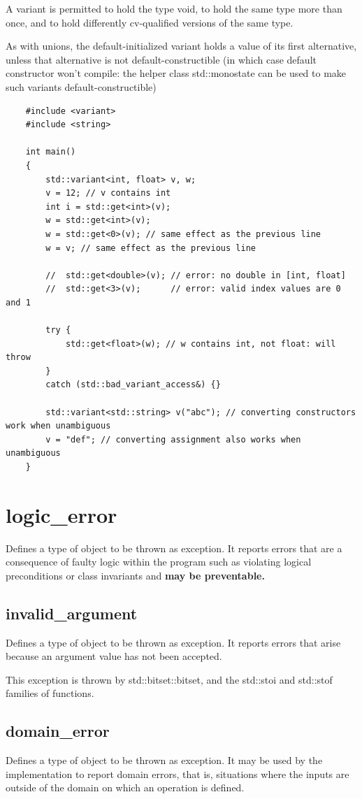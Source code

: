 \documentclass[UTF8,a4paper,12pt]{ctexbook}
\begin{document}
				A variant is permitted to hold the type void, to hold the same type more than once, and to hold differently cv-qualified versions of the same type.
				
				As with unions, the default-initialized variant holds a value of its first alternative, unless that alternative is not default-constructible (in which case default constructor won't compile: the helper class std::monostate can be used to make such variants default-constructible)
\begin{lstlisting}
	#include <variant>
	#include <string>
	
	int main()
	{
		std::variant<int, float> v, w;
		v = 12; // v contains int
		int i = std::get<int>(v);
		w = std::get<int>(v);
		w = std::get<0>(v); // same effect as the previous line
		w = v; // same effect as the previous line
		
		//  std::get<double>(v); // error: no double in [int, float]
		//  std::get<3>(v);      // error: valid index values are 0 and 1
		
		try {
			std::get<float>(w); // w contains int, not float: will throw
		}
		catch (std::bad_variant_access&) {}
		
		std::variant<std::string> v("abc"); // converting constructors work when unambiguous
		v = "def"; // converting assignment also works when unambiguous
	}
\end{lstlisting} 
	\section{logic\_error}
		Defines a type of object to be thrown as exception. It reports errors that are a consequence of faulty logic within the program such as violating logical preconditions or class invariants and \textbf{may be preventable.}
		\subsection{invalid\_argument}
			Defines a type of object to be thrown as exception. It reports errors that arise because an argument value has not been accepted.
			
			This exception is thrown by std::bitset::bitset, and the std::stoi and std::stof families of functions. 
		\subsection{domain\_error}
			Defines a type of object to be thrown as exception. It may be used by the implementation to report domain errors, that is, situations where the inputs are outside of the domain on which an operation is defined.
			
\end{document}
